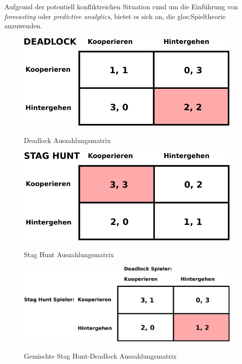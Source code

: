 \documentclass[12pt,a4paper,listof=totoc,oneside]{scrreprt}
\begin{document}
Aufgrund der potentiell konfliktreichen Situation rund um die Einführung von
\emph{forecasting} oder \emph{predictive analytics}, bietet es sich an, die
\gls{glos:Spieltheorie} anzuwenden.


\begin{figure}%
\centering
\caption{Deadlock Auszahlungsmatrix}
\includegraphics[scale=0.8]{Grafiken/Deadlock_Ink.pdf} 
\label{pic:Deadlock}
\end{figure}

\begin{figure}%
\centering
\caption{Stag Hunt Auszahlungsmatrix}
\includegraphics[scale=0.8]{Grafiken/Stag_Hunt_Ink.pdf} 
\label{pic:StagHunt}
\end{figure}

\begin{figure}%
\centering
\caption{Gemischte Stag Hunt-Deadlock Auszahlungsmatrix}
\includegraphics[scale=0.7]{Grafiken/Mixed_Ink.pdf} 
\label{pic:Mixed}
\end{figure}
\end{document}
